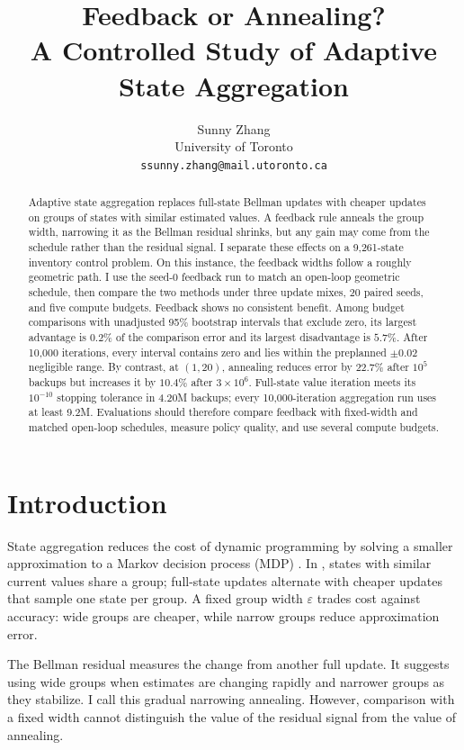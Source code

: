 \documentclass{article}
\title{Feedback or Annealing?\\
A Controlled Study of Adaptive State Aggregation}
\author{%
  Sunny Zhang\\
  University of Toronto\\
  \texttt{ssunny.zhang@mail.utoronto.ca}
}
\begin{document}
\maketitle

\begin{abstract}
Adaptive state aggregation replaces full-state Bellman updates with cheaper
updates on groups of states with similar estimated values.  A feedback rule
anneals the group width, narrowing it as the Bellman residual shrinks, but any
gain may come from the schedule rather than the residual signal.  I separate
these effects on a 9,261-state inventory control problem.  On this instance,
the feedback widths follow a roughly geometric path.  I use the seed-0 feedback
run to match an open-loop geometric schedule, then compare the two methods
under three update mixes, 20 paired seeds, and five compute budgets.  Feedback
shows no consistent benefit.  Among budget comparisons with unadjusted 95\%
bootstrap intervals that exclude zero, its largest advantage is $0.2\%$ of the
comparison error and its largest disadvantage is $5.7\%$.  After 10,000
iterations, every interval contains zero and lies within the preplanned
$\pm0.02$ negligible range.  By contrast, at $(1,20)$, annealing reduces error
by $22.7\%$ after $10^5$ backups but increases it by $10.4\%$ after
$3\times10^6$.  Full-state value iteration meets its $10^{-10}$ stopping
tolerance in 4.20M backups; every 10,000-iteration aggregation run uses at
least 9.2M.  Evaluations should therefore compare feedback with fixed-width
and matched open-loop schedules, measure policy quality, and use several
compute budgets.
\end{abstract}

\section{Introduction}

State aggregation reduces the cost of dynamic programming by solving a smaller
approximation to a Markov decision process (MDP)
\citep{whitt1978,bertsekas1989,li2006}.  In \citet{chen2021}, states with similar
current values share a group; full-state updates alternate with cheaper updates
that sample one state per group.  A fixed group width $\varepsilon$ trades cost
against accuracy: wide groups are cheaper, while narrow groups reduce
approximation error.

The Bellman residual measures the change from another full update.  It suggests
using wide groups when estimates are changing rapidly and narrower groups as
they stabilize.  I call this gradual narrowing annealing.  However, comparison
with a fixed width cannot distinguish the value of the residual signal from the
value of annealing.
\end{document}
